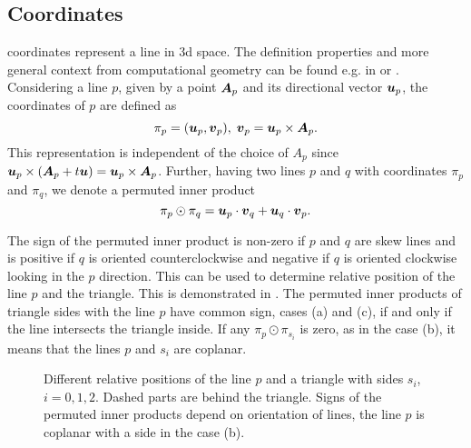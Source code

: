 \subsection{\plucker Coordinates}
\plucker coordinates represent a line in 3d space. The definition properties and more general context from computational 
geometry can be found e.g. in \cite{dorst_geometric_2007} or \cite{joswig_plucker_2013}.
Considering a line $p$, given by a point $\mathbf{\boldsymbol{A}}_p$ and its directional vector $\mathbf{\boldsymbol{u}}_p$, 
the \plucker coordinates of $p$ are defined as
\[ \pi_p = (\mathbf{\boldsymbol{u}}_p, \mathbf{\boldsymbol{v}}_p),\; \mathbf{\boldsymbol{v}}_p = \mathbf{\boldsymbol{u}}_p\times \mathbf{\boldsymbol{A}}_p. \]
This representation is independent of the choice of $A_p$ since $\mathbf{\boldsymbol{u}}_p\times (\mathbf{\boldsymbol{A}}_p + t \mathbf{\boldsymbol{u}}) = \mathbf{\boldsymbol{u}}_p\times \mathbf{\boldsymbol{A}}_p$.
Further, having two lines $p$ and $q$ with \plucker coordinates $\pi_p$ and $\pi_q$, we denote a permuted inner product
\[\pi_p \odot \pi_q = \mathbf{\boldsymbol{u}}_p\cdot \mathbf{\boldsymbol{v}}_q + \mathbf{\boldsymbol{u}}_q \cdot \mathbf{\boldsymbol{v}}_p. \]

The sign of the permuted inner product is non-zero if $p$ and $q$ are skew lines and is positive if $q$ is oriented counterclockwise and 
negative if $q$ is oriented clockwise looking in the $p$ direction. This can be used to determine relative position 
of the line $p$ and the triangle. This is demonstrated in .
The permuted inner products of triangle sides with the line $p$ have common sign, cases (a) and (c), if and only if the 
line intersects the triangle inside. If any $\pi_p\odot \pi_{s_i}$ is zero, as in the case (b), 
it means that the lines $p$ and $s_i$ are coplanar.

\begin{figure}[!htb]
    \centering
    \hspace{2ex}
    \hspace{2ex}
    \caption[Geometric illustration of \plucker products.]
    {Different relative positions of the line $p$ and a triangle with sides $s_i$, $i=0,1,2$. 
        Dashed parts are behind the triangle. Signs of the permuted inner products depend on orientation of lines,
        the line $p$ is coplanar with a side in the case (b).}
    \label{fig:plucker_products}
\end{figure}

